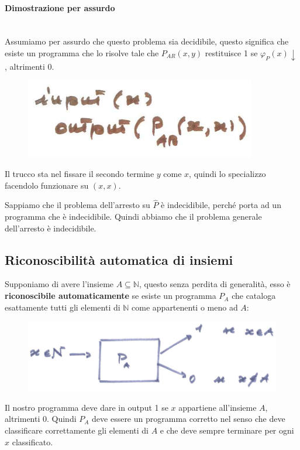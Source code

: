 \documentclass{article}
\begin{document}
\paragraph{Dimostrazione per assurdo}\mbox{}\\
Assumiamo per assurdo che questo problema sia decidibile, questo significa che esiste
un programma che lo risolve tale che $P_{AR}(x,y)$ restituisce 1 se $\varphi_{P}(x)\downarrow$,
altrimenti 0.
\begin{figure}[H]
    \centering
    \includegraphics[scale=0.65]{images/prob_gen_ind.png}
\end{figure}
Il trucco sta nel fissare il secondo termine $y$ come $x$, quindi lo specializzo facendolo
funzionare su $(x,x)$.

Sappiamo che il problema dell'arresto su $\hat{P}$ è indecidibile, perché porta ad un programma
che è indecidibile. Quindi abbiamo che il problema generale dell'arresto è indecidibile.

\subsection{Riconoscibilità automatica di insiemi}
Supponiamo di avere l'insieme $A\subseteq\mathbb{N}$, questo senza perdita di generalità,
esso è \textbf{riconoscibile automaticamente} se esiste un programma $P_A$ che cataloga
esattamente tutti gli elementi di $\mathbb{N}$ come appartenenti o meno ad $A$:
\begin{figure}[H]
    \centering
    \includegraphics[scale=0.5]{images/insiemi_riconoscibili.png}
\end{figure}
Il nostro programma deve dare in output 1 se $x$ appartiene all'insieme $A$, altrimenti 0. Quindi
$P_A$ deve essere un programma corretto nel senso che deve classificare correttamente
gli elementi di $A$ e che deve sempre terminare per ogni $x$ classificato.
\end{document}
